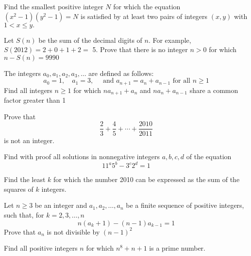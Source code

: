 \documentclass{pset}
\begin{document}
\begin{problems}
\begin{problem}[IrMO 2013 Q8]
    Find the smallest positive integer \(N\) for which the equation \(\left(x^{2}-1\right)\left(y^{2}-1\right)=N\) is satisfied by at least two pairs of integers \((x, y)\) with \(1<x \leq y .\)
\end{problem}

\begin{problem}[IrMO 2012 Q6]
    Let \(S(n)\) be the sum of the decimal digits of \(n .\) For example, \(S(2012)=2+0+1+2=\)
    5. Prove that there is no integer \(n>0\) for which \(n-S(n)=9990\)
\end{problem}

\begin{problem}[IrMO 2011 Q3]
    The integers \(a_{0}, a_{1}, a_{2}, a_{3}, \ldots\) are defined as follows:
    $$
    a_{0}=1, \quad a_{1}=3, \quad \text { and } a_{n+1}=a_{n}+a_{n-1} \text { for all } n \geq 1
    $$
    Find all integers \(n \geq 1\) for which \(n a_{n+1}+a_{n}\) and \(n a_{n}+a_{n-1}\) share a common factor greater than 1
\end{problem}

\begin{problem}[IrMO 2011 Q6]
    Prove that
    $$
    \frac{2}{3}+\frac{4}{5}+\cdots+\frac{2010}{2011}
    $$
    is not an integer.
\end{problem}

\begin{problem}[IrMO 2011 Q10]
    Find with proof all solutions in nonnegative integers \(a, b, c, d\) of the equation
    $$
    11^{a} 5^{b}-3^{c} 2^{d}=1
    $$
\end{problem}

\begin{problem}[IrMO 2010 Q1]
    Find the least \(k\) for which the number 2010 can be expressed as the sum of the squares of \(k\) integers.
\end{problem}


\begin{problem}[IrMO 2010 Q9]
    Let \(n \geq 3\) be an integer and \(a_{1}, a_{2}, \ldots, a_{n}\) be a finite sequence of positive integers, such that, for \(k=2,3, \ldots, n\)
    $$
    n\left(a_{k}+1\right)-(n-1) a_{k-1}=1
    $$
    Prove that \(a_{n}\) is not divisible by \((n-1)^{2}\)
\end{problem}

\begin{problem}[IrMO 2009 Q3]
    Find all positive integers \(n\) for which \(n^{8}+n+1\) is a prime number.
\end{problem}


\end{problems}
\end{document}
